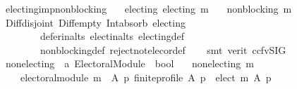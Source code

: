 \begin{isabellebody}
\endisatagproof
{\isafoldproof}%
%
\isadelimproof
\isanewline
%
\endisadelimproof
\isanewline
{}\isamarkupfalse%
\ electing{\isacharunderscore}{\kern0pt}imp{\isacharunderscore}{\kern0pt}non{\isacharunderscore}{\kern0pt}blocking{\isacharcolon}{\kern0pt}\isanewline
\ \ \ electing{\isacharcolon}{\kern0pt}\ {\isachardoublequoteopen}electing\ m{\isachardoublequoteclose}\isanewline
\ \ \ {\isachardoublequoteopen}non{\isacharunderscore}{\kern0pt}blocking\ m{\isachardoublequoteclose}\isanewline
%
\isadelimproof
\ \ %
\endisadelimproof
%
\isatagproof
{}\isamarkupfalse%
\ Diff{\isacharunderscore}{\kern0pt}disjoint\ Diff{\isacharunderscore}{\kern0pt}empty\ Int{\isacharunderscore}{\kern0pt}absorb{}\ electing\isanewline
\ \ \ \ \ \ \ \ defer{\isacharunderscore}{\kern0pt}in{\isacharunderscore}{\kern0pt}alts\ elect{\isacharunderscore}{\kern0pt}in{\isacharunderscore}{\kern0pt}alts\ electing{\isacharunderscore}{\kern0pt}def\isanewline
\ \ \ \ \ \ \ \ non{\isacharunderscore}{\kern0pt}blocking{\isacharunderscore}{\kern0pt}def\ reject{\isacharunderscore}{\kern0pt}not{\isacharunderscore}{\kern0pt}elec{\isacharunderscore}{\kern0pt}or{\isacharunderscore}{\kern0pt}def\isanewline
\ \ \isamarkupfalse%
\ {\isacharparenleft}{\kern0pt}smt\ {\isacharparenleft}{\kern0pt}verit{\isacharcomma}{\kern0pt}\ ccfv{\isacharunderscore}{\kern0pt}SIG{\isacharparenright}{\kern0pt}{\isacharparenright}{\kern0pt}%
\endisatagproof
{\isafoldproof}%
%
\isadelimproof
%
\endisadelimproof
%
\isadelimdocument
%
\endisadelimdocument
%
\isatagdocument
%
\isamarkuptrue%
%
\endisatagdocument
{\isafolddocument}%
%
\isadelimdocument
%
\endisadelimdocument
{}\isamarkupfalse%
\ non{\isacharunderscore}{\kern0pt}electing\ {\isacharcolon}{\kern0pt}{\isacharcolon}{\kern0pt}\ {\isachardoublequoteopen}{\isacharprime}{\kern0pt}a\ Electoral{\isacharunderscore}{\kern0pt}Module\ {\isasymRightarrow}\ bool{\isachardoublequoteclose}\ \isanewline
\ \ {\isachardoublequoteopen}non{\isacharunderscore}{\kern0pt}electing\ m\ {\isasymequiv}\isanewline
\ \ \ \ electoral{\isacharunderscore}{\kern0pt}module\ m\ {\isasymand}\ {\isacharparenleft}{\kern0pt}{\isasymforall}A\ p{\isachardot}{\kern0pt}\ finite{\isacharunderscore}{\kern0pt}profile\ A\ p\ {\isasymlongrightarrow}\ elect\ m\ A\ p\ {\isacharequal}{\kern0pt}\ {\isacharbraceleft}{\kern0pt}{\isacharbraceright}{\kern0pt}{\isacharparenright}{\kern0pt}{\isachardoublequoteclose}\isanewline
\isanewline
{}\isamarkupfalse%

\end{isabellebody}
